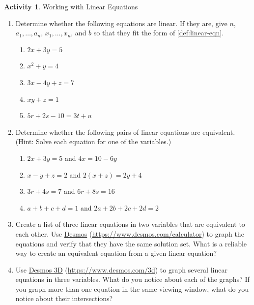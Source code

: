 \documentclass{article}
\theoremstyle{definition}
\newtheorem{activity}{Activity}
\begin{document}
\begin{activity}Working with Linear Equations

    \begin{enumerate}
        \item Determine whether the following equations are linear. If they are, give \(n\), \(a_1, \ldots, a_n\), \(x_1, \ldots, x_n\), and \(b\) so that they fit the form of \cref{def:linear-eqn}.
        \begin{enumerate}[label=(\alph*)]
            \item \(2x+3y=5\)
            \item \(x^2+y=4\)
            \item \(3x-4y+z=7\)
            \item \(xy+z=1\)
            \item \(5r+2s-10=3t+u\)
        \end{enumerate}
        \item Determine whether the following pairs of linear equations are equivalent. (Hint: Solve each equation for one of the variables.)
        \begin{enumerate}[label=(\alph*)]
            \item \(2x+3y=5\) and \(4x=10-6y\)
            \item \(x-y+z=2\) and \(2(x+z)=2y+4\)
            \item \(3r+4s=7\) and \(6r+8s=16\)
            \item \(a+b+c+d=1\) and \(2a+2b+2c+2d=2\)
        \end{enumerate}
        \item Create a list of three linear equations in two variables that are equivalent to each other. Use \href{https://www.desmos.com/calculator}{Desmos} (\url{https://www.desmos.com/calculator}) to graph the equations and verify that they have the same solution set. What is a reliable way to create an equivalent equation from a given linear equation?
        \item Use \href{https://www.desmos.com/3d}{Desmos 3D} (\url{https://www.desmos.com/3d}) to graph several linear equations in three variables. What do you notice about each of the graphs? If you graph more than one equation in the same viewing window, what do you notice about their intersections?
    \end{enumerate}
\end{activity}
\end{document}
